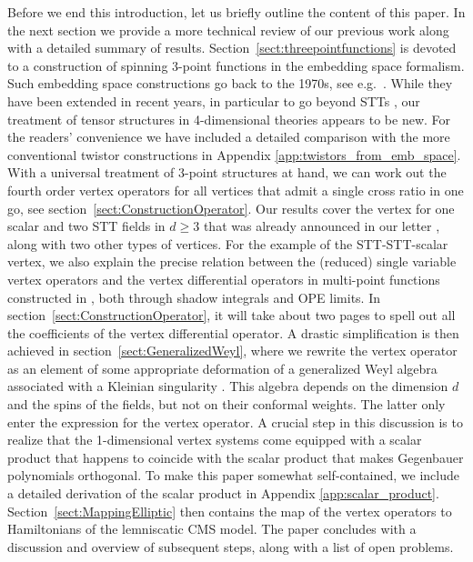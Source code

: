 \documentclass{article}
\begin{document}
Before we end this introduction, let us briefly outline the content of this 
paper. In the next section we provide a more technical review of our 
previous work along with a detailed summary of results. 
Section~\ref{sect:threepointfunctions} is devoted to a construction of spinning 
3-point functions in the embedding space formalism. Such embedding space constructions go back to the 1970s, see e.g.\ \cite{Dobrev:1977qv}. While they have been extended 
in recent years, in particular to go beyond STTs \cite{Costa:2011mg,Costa_2015,Lauria:2018klo}, our treatment of tensor structures in 4-dimensional 
theories appears to be new. For the readers' convenience we have included a detailed
comparison with the more conventional twistor constructions in Appendix \ref{app:twistors_from_emb_space}. With a 
universal treatment of 3-point structures at hand, we can work out the fourth order 
vertex operators for all vertices that admit a single cross ratio in one go, see 
section~\ref{sect:ConstructionOperator}. Our results cover the vertex for one scalar 
and two STT fields in $d \geq 3$ that was already announced in our letter \cite{Buric:2020dyz}, along with two other types of vertices. For the example of the STT-STT-scalar 
vertex, we also explain the precise relation between the (reduced) single variable 
vertex operators and the vertex 
differential operators in multi-point functions constructed in \cite{Buric:2021ywo}, 
both through shadow integrals and OPE limits. In section~\ref{sect:ConstructionOperator},
it will take about two pages to spell out all the coefficients of the vertex differential 
operator. A drastic simplification is then achieved in section~\ref{sect:GeneralizedWeyl}, 
where we rewrite the vertex operator as an element of some appropriate deformation of a 
generalized Weyl algebra \cite{bavula1992generalized} associated with a Kleinian singularity 
\cite{hodges1993noncommutative,crawley1998noncommutative,holland1999quantization}. 
This algebra depends on the dimension $d$ and the spins of the fields, but not on their 
conformal weights. The latter only enter the expression for the vertex operator. A 
crucial step in this discussion is to realize that the 1-dimensional vertex systems 
come equipped with a scalar product that happens to coincide with the scalar product that 
makes Gegenbauer polynomials orthogonal. To make this paper somewhat self-contained, we 
include a detailed derivation of the scalar product in Appendix \ref{app:scalar_product}.
Section~\ref{sect:MappingElliptic} then contains the map of the vertex operators to 
Hamiltonians of the lemniscatic CMS model. The paper concludes with a discussion and 
overview of subsequent steps, along with a list of open problems. 
\end{document}
